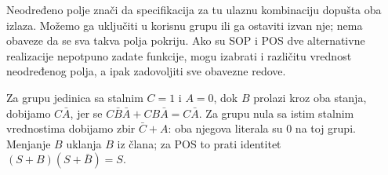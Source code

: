 
Neodređeno polje znači da specifikacija za tu ulaznu kombinaciju dopušta oba izlaza. Možemo ga uključiti u korisnu grupu ili ga ostaviti izvan nje; nema obaveze da se sva takva polja pokriju. Ako su SOP i POS dve alternativne realizacije nepotpuno zadate funkcije, mogu izabrati i različitu vrednost neodređenog polja, a ipak zadovoljiti sve obavezne redove.

Za grupu jedinica sa stalnim \(C=1\) i \(A=0\), dok \(B\) prolazi kroz oba stanja, dobijamo \(C\bar A\), jer se \(C\bar B\bar A+CB\bar A=C\bar A\). Za grupu nula sa istim stalnim vrednostima dobijamo zbir \(\bar C+A\): oba njegova literala su 0 na toj grupi. Menjanje \(B\) uklanja \(B\) iz člana; za POS to prati identitet \((S+B)(S+\bar B)=S\).
